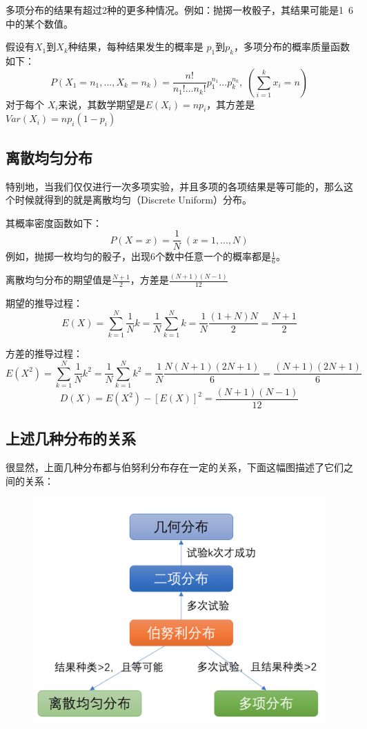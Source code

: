 \documentclass[12pt]{article}
\begin{document}
多项分布的结果有超过2种的更多种情况。例如：抛掷一枚骰子，其结果可能是1~6中的某个数值。

假设有$X_1$到$X_k$种结果，每种结果发生的概率是
$p_1$到$p_k$，多项分布的概率质量函数如下：
$$
P(X_1=n_1,...,X_k=n_k) = \frac{n!}{n_1! ... n_k !} p_1^{n_1} ... p_k^{n_{k}} , \; (\sum_{i=1}^k x_{i} = n)
$$
对于每个 $X_i$来说，其数学期望是$E(X_i) = np_i$，其方差是$Var(X_i) = np_i(1-p_i)$

\subsection{离散均匀分布}
特别地，当我们仅仅进行一次多项实验，并且多项的各项结果是等可能的，那么这个时候就得到的就是离散均匀（Discrete Uniform）分布。

其概率密度函数如下：
$$
P(X = x) = \frac{1}{N} \; (x= 1,...,N)
$$
例如，抛掷一枚均匀的骰子，出现6个数中任意一个的概率都是$\frac{1}{6}$。

离散均匀分布的期望值是$\frac{N+1}{2}$，方差是$\frac{(N+1)(N-1)}{12}$

期望的推导过程：
$$
E(X) = \sum_{k=1}^{N}\frac{1}{N}k = \frac{1}{N} \sum_{k=1}^{N}k = \frac{1}{N}\frac{(1+N)N}{2} = \frac{N+1}{2}
$$

方差的推导过程：
$$
E(X^2) = \sum_{k=1}^{N}\frac{1}{N}k^2 = \frac{1}{N} \sum_{k=1}^{N}k^2 = \frac{1}{N}\frac{N(N+1)(2N+1)}{6} = \frac{(N+1)(2N+1)}{6}
$$
$$
D(X) = E(X^2) - [E(X)]^2 = \frac{(N+1)(N-1)}{12}
$$

\subsection{上述几种分布的关系}
很显然，上面几种分布都与伯努利分布存在一定的关系，下面这幅图描述了它们之间的关系：
\begin{figure}[H]
  \centering
  \includegraphics[width=.8\textwidth]{fig/bernoulli_related.png} 
\end{figure}
\end{document}
